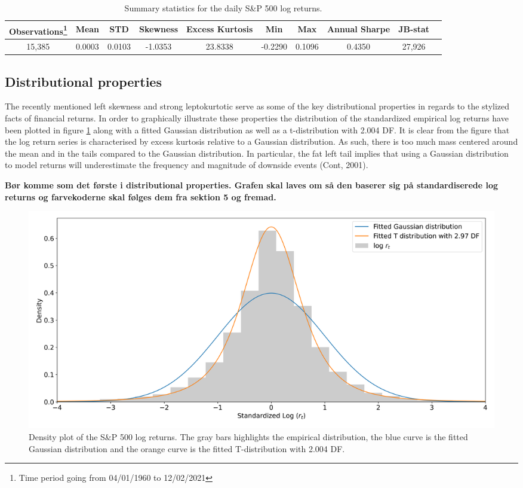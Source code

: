 \begin{table}[H]
\small
\caption{Summary statistics for the daily S\&P 500 log returns.}
\centering
\begin{tabular}{c c c c c c c c c c} 
\hline\hline
Observations\footnote{Time period going from 04/01/1960 to 12/02/2021} & Mean & STD & Skewness & Excess Kurtosis & Min & Max & Annual Sharpe & JB-stat \\
\hline
15,385 & 0.0003 & 0.0103 & -1.0353 & 23.8338 & -0.2290 & 0.1096 & 0.4350 & 27,926 \\
\hline
\end{tabular}
\label{tab:summary_stats_S&P500}
\end{table}
 

\subsection{Distributional properties} 
The recently mentioned left skewness and strong leptokurtotic serve as some of the key distributional properties in regards to the stylized facts of financial returns. In order to graphically illustrate these properties the distribution of the standardized empirical log returns have been plotted in figure \ref{fig: Kernel_distributions} along with a fitted Gaussian distribution as well as a t-distribution with 2.004 DF. It is clear from the figure that the log return series is characterised by excess kurtosis relative to a Gaussian distribution. As such, there is too much mass centered around the mean and in the tails compared to the Gaussian distribution. In particular, the fat left tail implies that using a Gaussian distribution to model returns will underestimate the frequency and magnitude of downside events (Cont, 2001). 

\textbf{Bør komme som det første i distributional properties. Grafen skal laves om så den baserer sig på standardiserede log returns og farvekoderne skal følges dem fra sektion 5 og fremad.}
\begin{figure}[H] 
    \centering
    \includegraphics[width=1\textwidth]{analysis/data_description/images/SP500_distribution.png}
    \caption[Density plot of the S\&P 500 log returns] {Density plot of the S\&P 500 log returns. The gray bars highlights the empirical distribution, the blue curve is the fitted Gaussian distribution and the orange curve is the fitted T-distribution with 2.004 DF.}
    \label{fig: Kernel_distributions}
\end{figure}

